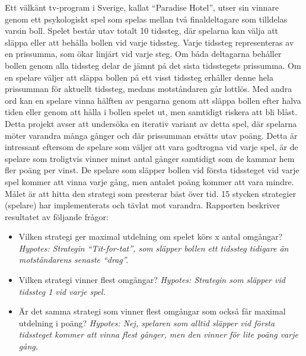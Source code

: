 \noindent
Ett välkänt tv-program i Sverige, kallat “Paradise Hotel”, utser sin vinnare genom ett psykologiskt spel som spelas mellan två finaldeltagare som tilldelas varsin boll. Spelet består utav totalt 10 tidssteg, där spelarna kan välja att släppa eller att behålla bollen vid varje tidssteg. Varje tidssteg representeras av en prissumma, som ökar linjärt vid varje steg. Om båda deltagarna behåller bollen genom alla tidssteg delar de jämnt på det sista tidsstegets prissumma. Om en spelare väljer att släppa bollen på ett visst tidssteg erhåller denne hela prissumman för aktuellt tidssteg, medans motståndaren går lottlös. Med andra ord kan en spelare vinna hälften av pengarna genom att släppa bollen efter halva tiden eller genom att hålla i bollen spelet ut, men samtidigt riskera att bli blåst. \\

\noindent
Detta projekt avser att undersöka en iterativ variant av detta spel, där spelarna möter varandra många gånger och där prissumman ersätts utav poäng. Detta är intressant eftersom de spelare som väljer att vara godtrogna vid varje spel, är de spelare som troligtvis vinner minst antal gånger samtidigt som de kammar hem fler poäng per vinst. De spelare som släpper bollen vid första tidssteget vid varje spel kommer att vinna varje gång, men antalet poäng kommer att vara mindre. Målet är att hitta den strategi som presterar bäst över tid. 15 stycken strategier (spelare) har implementerats och tävlat mot varandra. Rapporten beskriver resultatet av följande frågor:

\begin{itemize}
\item Vilken strategi ger maximal utdelning om spelet körs x antal omgångar?
	\emph{Hypotes: Strategin “Tit-for-tat”, som släpper bollen ett tidssteg tidigare än motståndarens senaste “drag”.}
\item Vilken strategi vinner flest omgångar?
	\emph{Hypotes: Strategin som släpper vid tidssteg 1 vid varje spel.}
\item Är det samma strategi som vinner flest omgångar som också får maximal utdelning i poäng?
	\emph{Hypotes: Nej, spelaren som alltid släpper vid första tidssteget kommer att vinna flest gånger, men den vinner för lite poäng varje gång.}
\end{itemize}
